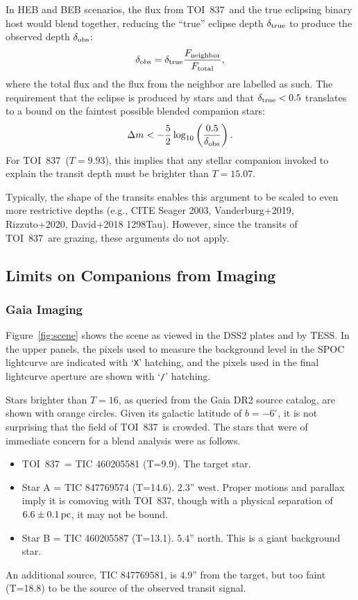 \documentclass[12pt,twocolumn,tighten]{aastex62}
\newcommand{\tn}{TOI~837} %
\begin{document}
In HEB and BEB scenarios, the flux from \tn\ and the true eclipsing
binary host would blend together, reducing the ``true'' eclipse depth
$\delta_{\rm true}$ to produce the observed depth
$\delta_{\rm obs}$:
\begin{equation}
  \delta_{\rm obs}
  = 
  \delta_{\rm true} \frac{F_{\rm neighbor}}{F_{\rm total}},
\end{equation}
where the total flux and the flux from the neighbor are labelled as
such.  The requirement that the eclipse is produced by stars and that
$\delta_{\rm true} < 0.5$ translates to a bound on the faintest
possible blended companion stars:
\begin{equation}
    \Delta m < - \frac{5}{2} \log_{10} \left( \frac{0.5}{\delta_{\rm obs}} \right).
\end{equation}
For \tn\ ($T=9.93$), this implies that any stellar companion invoked
to explain the transit depth must be brighter than $T=15.07$.

Typically, the shape of the transits enables this argument to be scaled to even
more restrictive depths (e.g., CITE Seager 2003, Vanderburg+2019,
Rizzuto+2020, David+2018 1298Tau).  However, since the transits of
\tn\ are grazing, these arguments do not apply.

\subsection{Limits on Companions from Imaging}

\subsubsection{Gaia Imaging}
Figure~\ref{fig:scene} shows the scene as viewed in the DSS2 plates
and by TESS.  In the upper panels, the pixels used to measure the
background level in the SPOC lightcurve are indicated with
`\texttt{X}' hatching, and the pixels used in the final lightcurve
aperture are shown with `\texttt{/}' hatching.

Stars brighter than $T=16$, as queried from the Gaia DR2 source
catalog, are shown with orange circles.  Given its galactic latitude
of $b=-6^\circ$, it is not surprising that the field of \tn\ is
crowded.  The stars that were of immediate concern for a blend
analysis were as follows.
\begin{itemize}
  \item \tn\ = TIC 460205581 (T=9.9). The target star.
  \item Star A = TIC 847769574 (T=14.6). $2.3$'' west. Proper motions
    and parallax imply it is comoving with \tn, though with a physical
    separation of $6.6\pm 0.1\,{\rm pc}$, it may not be bound.
  \item Star B = TIC 460205587 (T=13.1). $5.4$'' north.  This is a
    giant background star.
\end{itemize}
An additional source, TIC 847769581, is $4.9$'' from the target, but
too faint (T=18.8) to be the source of the observed transit signal.
\end{document}
